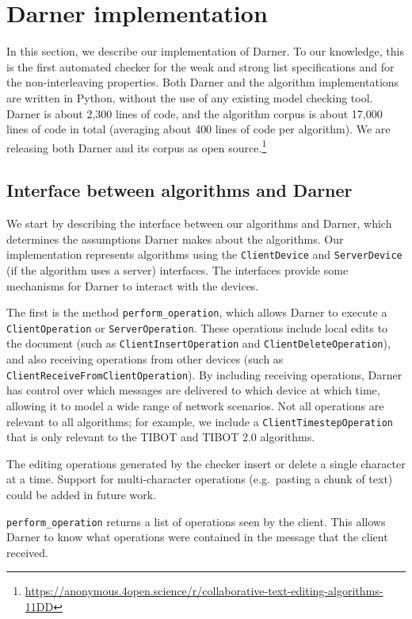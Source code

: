 \documentclass[sigplan,10pt,review,anonymous]{acmart}
\newcommand{\artifacturl}{https://anonymous.4open.science/r/collaborative-text-editing-algorithms-11DD}
\begin{document}
\section{Darner implementation} \label{sec:modelcheckerimplementation}

In this section, we describe our implementation of Darner. To our knowledge, this is the first automated checker for the weak and strong list specifications and for the non-interleaving properties. Both Darner and the algorithm implementations are written in Python, without the use of any existing model checking tool. Darner is about 2,300 lines of code, and the algorithm corpus is about 17,000 lines of code in total (averaging about 400 lines of code per algorithm).
We are releasing both Darner and its corpus as open source.\footnote{\url{\artifacturl}}

\subsection{Interface between algorithms and Darner}

We start by describing the interface between our algorithms and Darner, which determines the assumptions Darner makes about the algorithms.
Our implementation represents algorithms using the \texttt{ClientDevice} and \texttt{ServerDevice} (if the algorithm uses a server) interfaces. The interfaces provide
some mechanisms for Darner to interact with the devices.

The first is the method \texttt{perform\_operation}, which allows Darner to execute a \texttt{ClientOperation} or \texttt{ServerOperation}. These operations
include local edits to the document (such as \texttt{ClientInsertOperation} and \texttt{ClientDeleteOperation}), and also receiving operations from other devices
(such as \texttt{ClientReceiveFromClientOperation}). By including receiving operations, Darner has control over which messages are delivered to 
which device at which time, allowing it to model a wide range of network scenarios. Not all operations are relevant to all algorithms; for example, we include a \texttt{ClientTimestepOperation} that is only relevant to the TIBOT and TIBOT 2.0 algorithms.

The editing operations generated by the checker insert or delete a single character at a time. Support for multi-character operations (e.g.\ pasting a chunk of text) could be added in future work.

\texttt{perform\_operation} returns a list of operations seen by the client. This allows Darner to know what operations were contained in the message that the client received.
\end{document}
